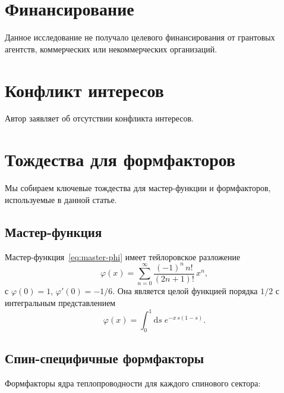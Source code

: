 \documentclass[12pt,a4paper]{article}
\newcommand{\dd}{\mathrm{d}}
\theoremstyle{plain}
\theoremstyle{definition}
\begin{document}
\section*{Финансирование}

Данное исследование не получало целевого финансирования от грантовых агентств,
коммерческих или некоммерческих организаций.

\section*{Конфликт интересов}

Автор заявляет об отсутствии конфликта интересов.

\appendix
\section{Тождества для формфакторов}
\label{app:form-factor-identities}

Мы собираем ключевые тождества для мастер-функции и формфакторов,
используемые в данной статье.

\subsection{Мастер-функция}

Мастер-функция~\eqref{eq:master-phi} имеет тейлоровское разложение
\begin{equation}\label{eq:phi-taylor}
  \varphi(x) = \sum_{n=0}^{\infty} \frac{(-1)^n\, n!}{(2n+1)!}\,x^n,
\end{equation}
с $\varphi(0) = 1$, $\varphi'(0) = -1/6$.  Она является целой функцией
порядка $1/2$ с интегральным представлением
\begin{equation}\label{eq:phi-integral}
  \varphi(x) = \int_0^1 \dd s\; e^{-x\,s(1-s)}.
\end{equation}

\subsection{Спин-специфичные формфакторы}

Формфакторы ядра теплопроводности для каждого спинового сектора:
\end{document}
